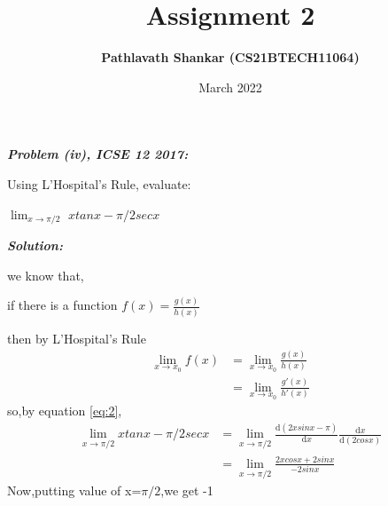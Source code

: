 \documentclass[journal,12pt,twocolumn]{IEEEtran}
\begin{document}
\newcommand{\myvec}[1]{\ensuremath{\begin{pmatrix}#1\end{pmatrix}}}

\let\vec\mathbf


\title{Assignment 2}
\author{\textbf{Pathlavath Shankar (CS21BTECH11064)}}
\maketitle
\date {March 2022}


\textbf{\textit{Problem (iv), ICSE 12 2017:}}

Using L’Hospital’s Rule, evaluate:

 $\lim_{x\to\pi/2}$ ${xtanx- \pi/2secx}$

\textbf{\textit{Solution:}}

we know that,

if there is a function $f(x)=\frac{g(x)}{h(x)}$

then by L’Hospital’s Rule 
\begin{align}
\lim_{x\to x_0} f(x)&=\lim_{x\to x_0} \frac{g(x)}{h(x)}  \\
\label{eq:2}
&=\lim_{x\to x_0} \frac{g'(x)}{h'(x)}
\end{align}
so,by equation \eqref{eq:2},
\begin{align}
\lim_{x\to\pi/2} {xtanx- \pi/2secx}&=\lim_{x\to\pi/2}
 {\frac{\mathrm{d}(2xsinx-\pi)}{\mathrm{d}x}\frac{\mathrm{d}x}{\mathrm{d}(2cosx)}} \\
&=\lim_{x\to\pi/2}\frac{2xcosx + 2sinx}{-2sinx}
\end{align}
Now,putting value of x=$\pi/2$,we get  {-1}       \\
\end{document}
